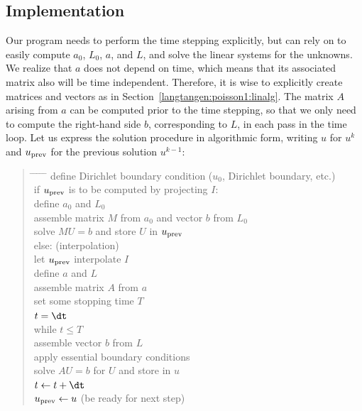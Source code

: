 \subsection{Implementation}
\label{langtangen:timedep:diffusion1:impl}

Our program needs to perform the time stepping explicitly, but can
rely on \fenics{} to easily compute $a_0$, $L_0$, $a$, and $L$,
and solve the linear systems for the unknowns.
We realize that $a$ does not depend on time, which means that its
associated matrix also will be time independent. Therefore, it is wise to
explicitly
create matrices and vectors as in Section~\ref{langtangen:poisson1:linalg}.
The matrix $A$ arising from $a$ can be computed prior to the time stepping,
so that we
only need to compute the right-hand side $b$, corresponding to $L$,
in each pass in the time loop. Let us express the
solution procedure in algorithmic form, writing
$u$ for $u^k$ and $u_{\rm prev}$
for the previous solution $u^{k-1}$:

\begin{quote}
\begin{tabbing}
\hspace*{0.5cm}\= \hspace{0.5cm} \= \hspace{0.5cm} \=
\hspace{0.5cm} \= \hspace{0.5cm} \= \kill
define Dirichlet boundary condition ($u_0$, Dirichlet boundary, etc.)\\
if $u_{\rm prev}$ is to be computed by projecting $I$:\\
\>define $a_0$ and $L_0$\\
\> assemble matrix $M$ from $a_0$ and vector $b$ from $L_0$\\
\> solve $MU=b$ and store $U$ in $u_{\rm prev}$\\
else:  (interpolation)\\
\> let $u_{\rm prev}$ interpolate $I$\\
define $a$ and $L$\\
assemble matrix $A$ from $a$\\
set some stopping time $T$\\
$t={\dt}$\\
while $t\leqslant T$\\
\> assemble vector $b$ from $L$\\
\> apply essential boundary conditions\\
\> solve $AU=b$ for $U$ and store in $u$\\
\> $t\leftarrow t + {\dt}$\\
\> $u_{\rm prev} \leftarrow u$ (be ready for next step)
\end{tabbing}
\end{quote}

